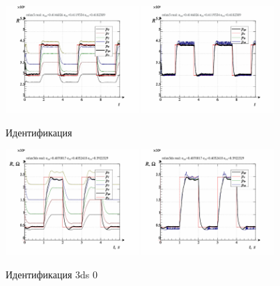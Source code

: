 \begin{figure}[htb!]
  \centerline{
    \includegraphics[width=0.45\textwidth]{p/relax3_read_id2-p_p_03.png}
    \hfill
    \includegraphics[width=0.45\textwidth]{p/relax3_read_id2-p_pp_03.png}
  }
  \caption{Идентификация }
  \label{atu:f:relax3d_id}
\end{figure}

\begin{figure}[htb!]
  \centerline{
    \includegraphics[width=0.45\textwidth]{p/relax3d_read_id2_0-p_p.png}
    \hfill
    \includegraphics[width=0.45\textwidth]{p/relax3d_read_id2_0-p_pp.png}
  }
  \caption{Идентификация 3ds 0}
  \label{atu:f:relax3ds_id_0}
\end{figure}

